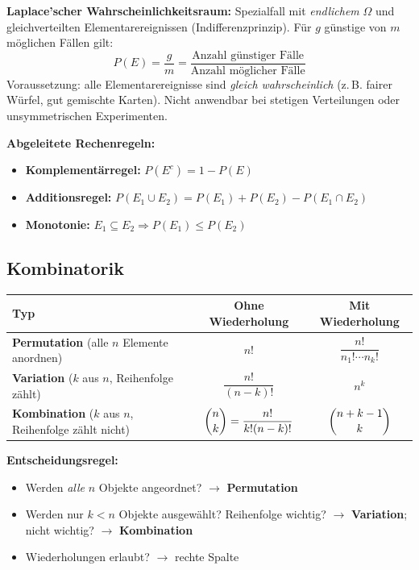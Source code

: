 \medskip
\noindent\textbf{Laplace'scher Wahrscheinlichkeitsraum:} Spezialfall mit \emph{endlichem} $\Omega$ und gleichverteilten Elementarereignissen (Indifferenzprinzip). Für $g$ günstige von $m$ möglichen Fällen gilt:
\[
    P(E) = \frac{g}{m} = \frac{\text{Anzahl günstiger Fälle}}{\text{Anzahl möglicher Fälle}}
\]
Voraussetzung: alle Elementarereignisse sind \emph{gleich wahrscheinlich} (z.\,B. fairer Würfel, gut gemischte Karten). Nicht anwendbar bei stetigen Verteilungen oder unsymmetrischen Experimenten.

\medskip
\noindent\textbf{Abgeleitete Rechenregeln:}
\begin{itemize}[leftmargin=1.5em]
    \item \textbf{Komplementärregel:} $P(E^c) = 1 - P(E)$
    \item \textbf{Additionsregel:} $P(E_1 \cup E_2) = P(E_1) + P(E_2) - P(E_1 \cap E_2)$
    \item \textbf{Monotonie:} $E_1 \subseteq E_2 \Rightarrow P(E_1) \leq P(E_2)$
\end{itemize}

\newpage

\subsection{Kombinatorik}


\begin{center}
\small
\begin{tabular}{|l|c|c|}
\hline
\textbf{Typ} & \textbf{Ohne Wiederholung} & \textbf{Mit Wiederholung} \\
\hline
\textbf{Permutation} (alle $n$ Elemente anordnen) & $n!$ & $\dfrac{n!}{n_1!\cdots n_k!}$ \\[6pt]
\hline
\textbf{Variation} ($k$ aus $n$, Reihenfolge zählt) & $\dfrac{n!}{(n-k)!}$ & $n^k$ \\[6pt]
\hline
\textbf{Kombination} ($k$ aus $n$, Reihenfolge zählt nicht) & $\dbinom{n}{k} = \dfrac{n!}{k!(n-k)!}$ & $\dbinom{n+k-1}{k}$ \\[6pt]
\hline
\end{tabular}
\end{center}

\textbf{Entscheidungsregel:}
\begin{itemize}[leftmargin=1.5em]
    \item Werden \emph{alle} $n$ Objekte angeordnet? $\to$ \textbf{Permutation}
    \item Werden nur $k < n$ Objekte ausgewählt? Reihenfolge wichtig? $\to$ \textbf{Variation}; nicht wichtig? $\to$ \textbf{Kombination}
    \item Wiederholungen erlaubt? $\to$ rechte Spalte
\end{itemize}

